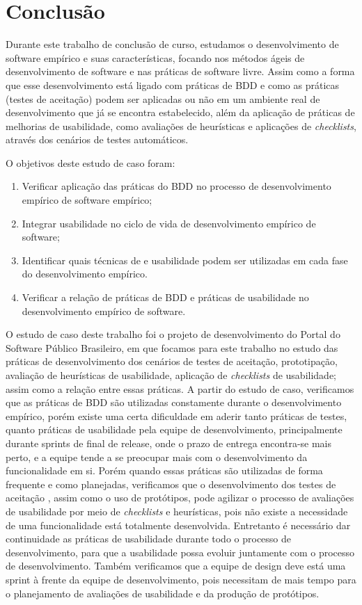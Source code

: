 \chapter{Conclusão}
\label{consideracoes-finais}

Durante este trabalho de conclusão de curso, estudamos o desenvolvimento de software empírico e suas características, focando nos métodos ágeis de desenvolvimento de software e nas práticas de software livre. Assim como a forma que esse desenvolvimento está ligado com práticas de BDD e como as práticas (testes de aceitação) podem ser aplicadas ou não em um ambiente real de desenvolvimento que já se encontra estabelecido, além da aplicação de práticas de melhorias de usabilidade, como avaliações de heurísticas e aplicações de \textit{checklists}, através dos cenários de testes automáticos.

O objetivos deste estudo de caso foram:
\begin{enumerate}
\item Verificar aplicação das práticas do BDD no processo de desenvolvimento empírico de software empírico;
\item Integrar usabilidade no ciclo de vida de desenvolvimento empírico de software;
\item Identificar quais técnicas de e usabilidade  podem ser utilizadas em cada fase do desenvolvimento empírico.
\item Verificar a relação de práticas de BDD e práticas de usabilidade no desenvolvimento empírico de software.
\end{enumerate}

O estudo de caso deste trabalho foi o projeto de desenvolvimento do Portal do Software Público Brasileiro, em que focamos para este trabalho no estudo das práticas de desenvolvimento dos cenários de testes de aceitação, prototipação, avaliação de heurísticas de usabilidade, aplicação de \textit{checklists} de usabilidade; assim como a relação entre essas práticas.
A partir do estudo de caso, verificamos que as práticas de BDD são utilizadas constamente durante o desenvolvimento empírico, porém existe uma certa dificuldade em aderir tanto práticas de testes, quanto práticas de usabilidade pela equipe de desenvolvimento, principalmente durante sprints de final de release, onde o prazo de entrega encontra-se mais perto, e a equipe tende a se preocupar mais com o desenvolvimento da funcionalidade em si. Porém quando essas práticas são utilizadas de forma frequente e como planejadas, verificamos que o desenvolvimento dos testes de aceitação , assim como o uso de protótipos, pode agilizar o processo de avaliações de usabilidade por meio de \textit{checklists} e heurísticas, pois não existe a necessidade de uma funcionalidade está totalmente desenvolvida. Entretanto é necessário dar continuidade as práticas de usabilidade durante todo o processo de desenvolvimento, para que a usabilidade possa evoluir juntamente com o processo de desenvolvimento. Também verificamos que a equipe de design deve está uma sprint à frente da equipe de desenvolvimento, pois necessitam de mais tempo para o planejamento de avaliações de usabilidade e da produção de protótipos.



